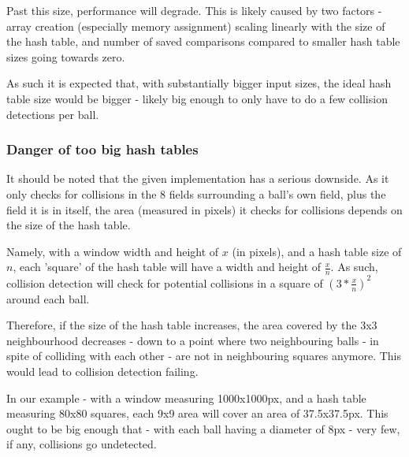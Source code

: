 \documentclass[a4paper]{scrartcl}
\begin{document}
Past this size, performance will degrade. This is likely caused by two factors
- array creation (especially memory assignment) scaling linearly with the size
of the hash table, and number of saved comparisons compared to smaller hash
table sizes going towards zero.

As such it is expected that, with substantially bigger input sizes, the ideal
hash table size would be bigger - likely big enough to only have to do a few
collision detections per ball.

\subsubsection{Danger of too big hash tables}

It should be noted that the given implementation has a serious downside. As it
only checks for collisions in the 8 fields surrounding a ball's own field, plus
the field it is in itself, the area (measured in pixels) it checks for
collisions depends on the size of the hash table.

Namely, with a window width and height of $x$ (in pixels), and a hash table
size of $n$, each 'square' of the hash table will have a width and height of
$\frac{x}{n}$. As such, collision detection will check for potential collisions
in a square of $(3 * \frac{x}{n})^2$ around each ball.

Therefore, if the size of the hash table increases, the area covered by the 3x3
neighbourhood decreases - down to a point where two neighbouring balls - in
spite of colliding with each other - are not in neighbouring squares anymore.
This would lead to collision detection failing.

In our example - with a window measuring 1000x1000px, and a hash table
measuring 80x80 squares, each 9x9 area will cover an area of 37.5x37.5px. This
ought to be big enough that - with each ball having a diameter of 8px - very
few, if any, collisions go undetected.
\end{document}
